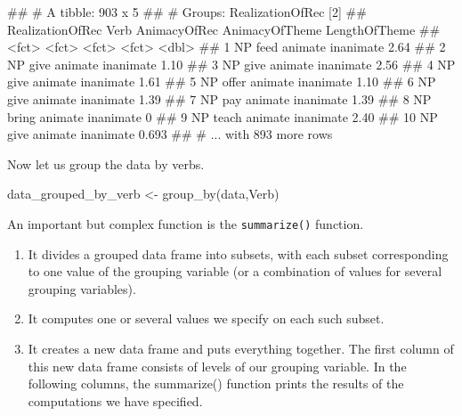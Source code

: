 \documentclass[
]{book}
\newenvironment{Shaded}{\begin{snugshade}}{\end{snugshade}}
\newcommand{\FunctionTok}[1]{\textcolor[rgb]{0.00,0.00,0.00}{#1}}
\newcommand{\NormalTok}[1]{#1}
\newcommand{\OtherTok}[1]{\textcolor[rgb]{0.56,0.35,0.01}{#1}}
\providecommand{\tightlist}{%
  \setlength{\itemsep}{0pt}\setlength{\parskip}{0pt}}
\begin{document}
\begin{Shaded}
\begin{Highlighting}[]
\NormalTok{\#\# \# A tibble: 903 x 5}
\NormalTok{\#\# \# Groups:   RealizationOfRec [2]}
\NormalTok{\#\#    RealizationOfRec Verb  AnimacyOfRec AnimacyOfTheme LengthOfTheme}
\NormalTok{\#\#    \textless{}fct\textgreater{}            \textless{}fct\textgreater{} \textless{}fct\textgreater{}        \textless{}fct\textgreater{}                  \textless{}dbl\textgreater{}}
\NormalTok{\#\#  1 NP               feed  animate      inanimate              2.64 }
\NormalTok{\#\#  2 NP               give  animate      inanimate              1.10 }
\NormalTok{\#\#  3 NP               give  animate      inanimate              2.56 }
\NormalTok{\#\#  4 NP               give  animate      inanimate              1.61 }
\NormalTok{\#\#  5 NP               offer animate      inanimate              1.10 }
\NormalTok{\#\#  6 NP               give  animate      inanimate              1.39 }
\NormalTok{\#\#  7 NP               pay   animate      inanimate              1.39 }
\NormalTok{\#\#  8 NP               bring animate      inanimate              0    }
\NormalTok{\#\#  9 NP               teach animate      inanimate              2.40 }
\NormalTok{\#\# 10 NP               give  animate      inanimate              0.693}
\NormalTok{\#\# \# ... with 893 more rows}
\end{Highlighting}
\end{Shaded}

Now let us group the data by verbs.

\begin{Shaded}
\begin{Highlighting}[]
\NormalTok{data\_grouped\_by\_verb }\OtherTok{\textless{}{-}} \FunctionTok{group\_by}\NormalTok{(data,Verb)}
\end{Highlighting}
\end{Shaded}

An important but complex function is the \texttt{summarize()} function.

\begin{enumerate}
\def\labelenumi{\arabic{enumi}.}
\tightlist
\item
  It divides a grouped data frame into subsets, with each subset corresponding to one value of the grouping variable (or a combination of values for several grouping variables).
\item
  It computes one or several values we specify on each such subset.
\item
  It creates a new data frame and puts everything together. The first column of this new data frame consists of levels of our grouping variable. In the following columns, the summarize() function prints the results of the computations we have specified.
\end{enumerate}
\end{document}
